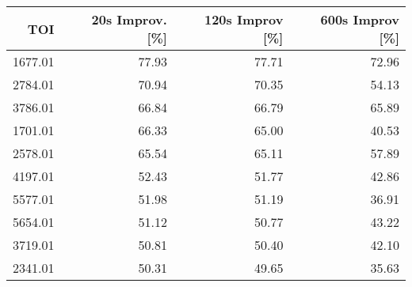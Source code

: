 \begin{tabular}{rrrr}
\toprule
    TOI &  20s Improv. [\%] &  120s Improv [\%] &  600s Improv [\%] \\
\midrule
1677.01 &            77.93 &            77.71 &            72.96 \\
2784.01 &            70.94 &            70.35 &            54.13 \\
3786.01 &            66.84 &            66.79 &            65.89 \\
1701.01 &            66.33 &            65.00 &            40.53 \\
2578.01 &            65.54 &            65.11 &            57.89 \\
4197.01 &            52.43 &            51.77 &            42.86 \\
5577.01 &            51.98 &            51.19 &            36.91 \\
5654.01 &            51.12 &            50.77 &            43.22 \\
3719.01 &            50.81 &            50.40 &            42.10 \\
2341.01 &            50.31 &            49.65 &            35.63 \\
\bottomrule
\end{tabular}
